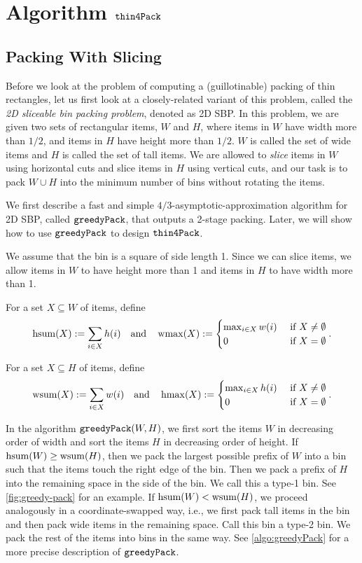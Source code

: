 \section{Algorithm \texorpdfstring{$\operatorname{\mathtt{thin4Pack}}$}{thin4Pack}}
\label{sec:thin-gpack}

\subsection{Packing With Slicing}

Before we look at the problem of computing a (guillotinable) packing of thin rectangles,
let us first look at a closely-related variant of this problem,
called the \emph{2D sliceable bin packing problem}, denoted as 2D SBP.
In this problem, we are given two sets of rectangular items, $W$ and $H$, where
items in $W$ have width more than $1/2$, and items in $H$ have height more than $1/2$.
$W$ is called the set of wide items and $H$ is called the set of tall items.
We are allowed to \emph{slice} items in $W$ using horizontal cuts
and slice items in $H$ using vertical cuts, and our task is to pack
$W \cup H$ into the minimum number of bins without rotating the items.

We first describe a fast and simple $4/3$-asymptotic-approximation algorithm
for 2D SBP, called $\operatorname{\mathtt{greedyPack}}$, that outputs a 2-stage packing.
Later, we will show how to use $\operatorname{\mathtt{greedyPack}}$ to design $\operatorname{\mathtt{thin4Pack}}$.

We assume that the bin is a square of side length 1. Since we can slice items,
we allow items in $W$ to have height more than 1
and items in $H$ to have width more than 1.

For a set $X \subseteq W$ of items, define
\[ \operatorname{hsum}(X) := \sum_{i \in X} h(i) \quad\textrm{and}\quad
\operatorname{wmax}(X) := \begin{cases}\max_{i \in X} w(i) & \textrm{ if } X \neq \emptyset
\\ 0 & \textrm{ if } X = \emptyset\end{cases}. \]

For a set $X \subseteq H$ of items, define
\[ \operatorname{wsum}(X) := \sum_{i \in X} w(i) \quad\textrm{and}\quad
\operatorname{hmax}(X) := \begin{cases}\max_{i \in X} h(i) & \textrm{ if } X \neq \emptyset
\\ 0 & \textrm{ if } X = \emptyset\end{cases}. \]

In the algorithm $\operatorname{\mathtt{greedyPack}}(W, H)$, we first sort the items $W$ in decreasing order
of width and sort the items $H$ in decreasing order of height.
If $\operatorname{hsum}(W) \ge \operatorname{wsum}(H)$, then we pack the largest possible prefix of $W$
into a bin such that the items touch the right edge of the bin.
Then we pack a prefix of $H$ into the remaining space in the side of the bin.
We call this a type-1 bin. See \cref{fig:greedy-pack} for an example.
If $\operatorname{hsum}(W) < \operatorname{wsum}(H)$, we proceed analogously in a coordinate-swapped way,
i.e., we first pack tall items in the bin and then pack wide items in the remaining space.
Call this bin a type-2 bin.
We pack the rest of the items into bins in the same way.
See \cref{algo:greedyPack} for a more precise description of $\operatorname{\mathtt{greedyPack}}$.

